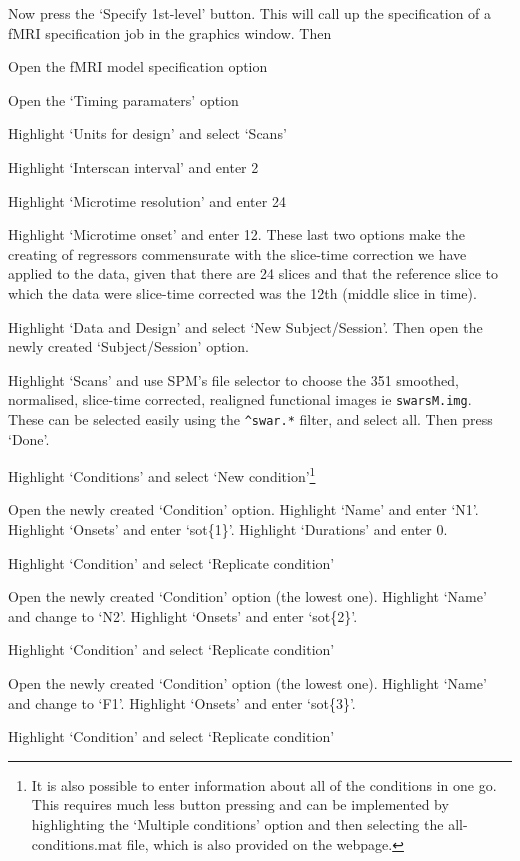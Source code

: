 Now press the `Specify 1st-level' button. This will call up the specification of a fMRI specification job in the graphics window. Then
\bi
\item{Open the fMRI model specification option}
\item{Open the `Timing paramaters' option}
\item{Highlight `Units for design' and select `Scans'}
\item{Highlight `Interscan interval' and enter 2}
\item{Highlight `Microtime resolution' and enter 24}
\item{Highlight `Microtime onset' and enter 12. These last two options make the creating of regressors commensurate with the slice-time correction we have applied to the data, given that there are 24 slices and that the reference slice to which the data were slice-time corrected was the 12th (middle slice in time).}
\item{Highlight `Data and Design' and select `New Subject/Session'. Then open the newly created `Subject/Session' option.}
\item{Highlight `Scans' and use SPM's file selector to 
choose the 351 smoothed, normalised, slice-time corrected, realigned functional images ie  \verb!swarsM.img!. These can be selected 
easily using the \verb!^swar.*! filter, and select all. Then press `Done'.}
\item{Highlight `Conditions' and select `New condition'\footnote{It is also possible to enter information about all of the conditions in one go. This requires much less button pressing and can be implemented by highlighting the `Multiple conditions' option and then selecting the {\sf all-conditions.mat} file, which is also provided on the webpage.}}
\item{Open the newly created `Condition' option. Highlight `Name' and enter `N1'. Highlight `Onsets' and enter `sot\{1\}'. Highlight `Durations' and enter 0.}
\item{Highlight `Condition' and select `Replicate condition'}
\item{Open the newly created `Condition' option (the lowest one). Highlight `Name' and change to `N2'. Highlight `Onsets' and enter `sot\{2\}'.}
\item{Highlight `Condition' and select `Replicate condition'}
\item{Open the newly created `Condition' option (the lowest one). Highlight `Name' and change to `F1'. Highlight `Onsets' and enter `sot\{3\}'.}
\item{Highlight `Condition' and select `Replicate condition'}

